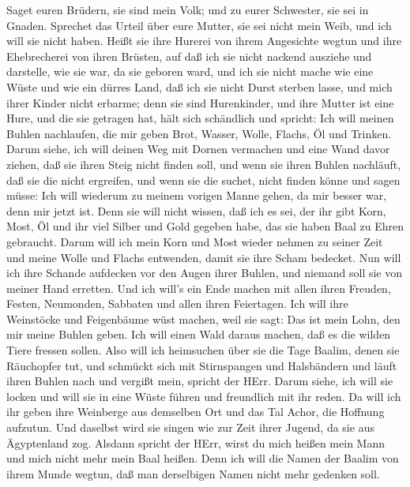  Saget euren Brüdern, sie sind mein Volk; und zu eurer
Schwester, sie sei in Gnaden.  Sprechet das Urteil über eure
Mutter, sie sei nicht mein Weib, und ich will sie nicht haben. Heißt sie
ihre Hurerei von ihrem Angesichte wegtun und ihre Ehebrecherei von ihren
Brüsten,  auf daß ich sie nicht nackend ausziehe und
darstelle, wie sie war, da sie geboren ward, und ich sie nicht mache wie
eine Wüste und wie ein dürres Land, daß ich sie nicht Durst sterben
lasse,  und mich ihrer Kinder nicht erbarme; denn sie sind
Hurenkinder,  und ihre Mutter ist eine Hure, und die sie
getragen hat, hält sich schändlich und spricht: Ich will meinen Buhlen
nachlaufen, die mir geben Brot, Wasser, Wolle, Flachs, Öl und Trinken.
 Darum siehe, ich will deinen Weg mit Dornen vermachen und
eine Wand davor ziehen, daß sie ihren Steig nicht finden soll,
 und wenn sie ihren Buhlen nachläuft, daß sie die nicht
ergreifen, und wenn sie die suchet, nicht finden könne und sagen müsse:
Ich will wiederum zu meinem vorigen Manne gehen, da mir besser war, denn
mir jetzt ist.  Denn sie will nicht wissen, daß ich es sei,
der ihr gibt Korn, Most, Öl und ihr viel Silber und Gold gegeben habe,
das sie haben Baal zu Ehren gebraucht.  Darum will ich mein
Korn und Most wieder nehmen zu seiner Zeit und meine Wolle und Flachs
entwenden, damit sie ihre Scham bedecket.  Nun will ich
ihre Schande aufdecken vor den Augen ihrer Buhlen, und niemand soll sie
von meiner Hand erretten.  Und ich will's ein Ende machen
mit allen ihren Freuden, Festen, Neumonden, Sabbaten und allen ihren
Feiertagen.  Ich will ihre Weinstöcke und Feigenbäume wüst
machen, weil sie sagt: Das ist mein Lohn, den mir meine Buhlen geben.
Ich will einen Wald daraus machen, daß es die wilden Tiere fressen
sollen.  Also will ich heimsuchen über sie die Tage Baalim,
denen sie Räuchopfer tut, und schmückt sich mit Stirnspangen und
Halsbändern und läuft ihren Buhlen nach und vergißt mein, spricht der
HErr.  Darum siehe, ich will sie locken und will sie in
eine Wüste führen und freundlich mit ihr reden.  Da will
ich ihr geben ihre Weinberge aus demselben Ort und das Tal Achor, die
Hoffnung aufzutun. Und daselbst wird sie singen wie zur Zeit ihrer
Jugend, da sie aus Ägyptenland zog.  Alsdann spricht der
HErr, wirst du mich heißen mein Mann und mich nicht mehr mein Baal
heißen.  Denn ich will die Namen der Baalim von ihrem Munde
wegtun, daß man derselbigen Namen nicht mehr gedenken soll.
